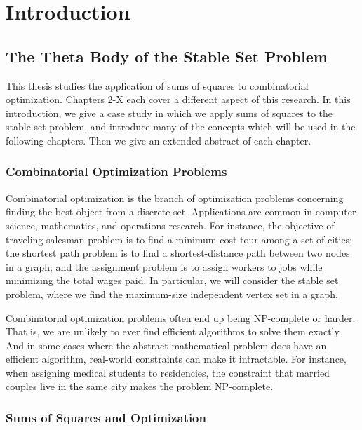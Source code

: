 


\chapter{Introduction}
\label{chap:Introduction}

\section{The Theta Body of the Stable Set Problem}
This thesis studies the application of sums of squares to combinatorial
optimization. Chapters 2-X each cover a different aspect of this research.
In this introduction, we give a case study in which we apply sums of squares
to the stable set problem, and introduce many of the concepts which will be 
used in the following chapters. Then we give an extended abstract of each
chapter.

\subsection{Combinatorial Optimization Problems}
Combinatorial optimization is the branch of optimization problems concerning
finding the best object from a discrete set. Applications are common in 
computer science, mathematics, and operations research. For instance, the 
objective of traveling salesman problem is to find a minimum-cost tour among
a set of cities; the shortest path problem is to find a shortest-distance
path between two nodes in a graph; and the assignment problem is to assign
workers to jobs while minimizing the total wages paid. In particular, we will
consider the 
stable set problem, where we find the maximum-size independent vertex set in a
graph.

Combinatorial optimization problems often end up being NP-complete or harder.
That is, we are unlikely to ever find efficient algorithms to solve them
exactly. And in some cases where the abstract mathematical problem does have
an efficient algorithm, real-world constraints can make it intractable. For
instance, when assigning medical students to residencies, the constraint that
married couples live in the same city makes the problem NP-complete.

\subsection{Sums of Squares and Optimization}

